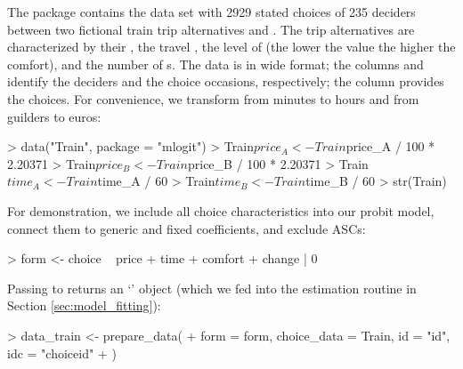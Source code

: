 \documentclass[article,shortnames]{jss}
\newcommand{\class}[1]{`\code{#1}'}
\newcommand{\fct}[1]{\code{#1()}}
\begin{document}
The  package contains the data set  with 2929 stated choices of 235 deciders between two fictional train trip alternatives  and . The trip alternatives are characterized by their , the travel , the level of  (the lower the value the higher the comfort), and the number of s. The data is in wide format; the columns  and  identify the deciders and the choice occasions, respectively; the column  provides the choices. For convenience, we transform  from minutes to hours and  from guilders to euros:

\begin{Schunk}
\begin{Sinput}
> data("Train", package = "mlogit")
> Train$price_A <- Train$price_A / 100 * 2.20371
> Train$price_B <- Train$price_B / 100 * 2.20371
> Train$time_A <- Train$time_A / 60
> Train$time_B <- Train$time_B / 60
> str(Train)
\end{Sinput}
\end{Schunk}

For demonstration, we include all choice characteristics into our probit model, connect them to generic and fixed coefficients, and exclude ASCs:

\begin{Schunk}
\begin{Sinput}
> form <- choice ~ price + time + comfort + change | 0
\end{Sinput}
\end{Schunk}

Passing  to \fct{prepare\_data} returns an \class{RprobitB\_data} object (which we fed into the estimation routine \fct{fit\_model} in Section \ref{sec:model_fitting}):

\begin{Schunk}
\begin{Sinput}
> data_train <- prepare_data(
+    form = form, choice_data = Train, id = "id", idc = "choiceid"
+  )
\end{Sinput}
\end{Schunk}
\end{document}
